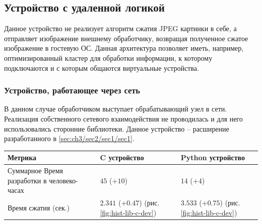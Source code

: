 \subsection{Устройство с удаленной логикой}\label{sec:ch3/sec2/sec2}

Данное устройство не реализует алгоритм сжатия JPEG картинки в себе,
а отправляет изображение внешнему обработчику,
возвращая полученное сжатое изображение в гостевую ОС.
Данная архитектура позволяет иметь, например, оптимизированный
кластер для обработки информации, к которому подключаются и с
которым общаются виртуальные устройства.

\subsubsection{Устройство, работающее через сеть}\label{sec:ch3/sec2/sec2/sec1}

В данном случае обработчиком выступает обрабатывающий узел в сети.
Реализация собственного сетевого взаимодействия не проводилась
и для него использовались сторонние библиотеки.
Данное устройство -- расширение разработанного в \ref{sec:ch3/sec2/sec1/sec1}.

\begin{longtable}{| p{5cm} | p{5cm} | p{5cm} |}
    \hline
        Метрика &
        C устройство &
        Python устройство \\
    \hline
        Суммарное Время разработки в человеко-часах &
        $45$ ($+10$) &
        $14$ ($+4$) \\
    \hline
        Время сжатия (сек.)&
        $2.341$ ($+0.47$) (рис. \ref{fig:hist-lib-c-dev}) &
        $3.533$ ($+0.75$) (рис. \ref{fig:hist-lib-c-dev}) \\
    \hline
\end{longtable}


